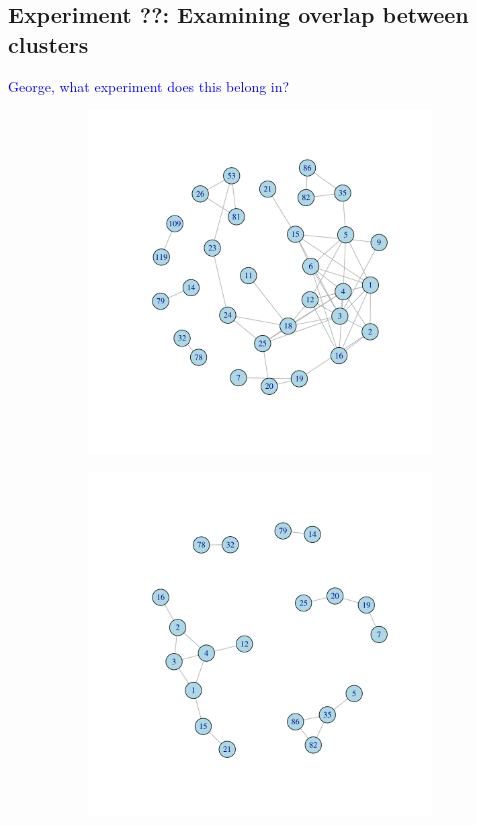 \documentclass[11pt, oneside]{article}   	%
\begin{document}
\subsection{Experiment ??: Examining overlap between clusters}
\textcolor{blue}{George, what experiment does this belong in?}
\begin{figure}[H]
	\centering
	\begin{subfigure}[t]{0.48\textwidth}
	 \centering
	 \includegraphics[width=\linewidth]{ikc10_k_pw.pdf} 
	 \end{subfigure}
 \hfill
	\begin{subfigure}[t]{0.48\textwidth}
        \centering
        \includegraphics[width=\linewidth]{ikc10_m_pw.pdf} 

\end{subfigure}
\end{figure}
\end{document}
